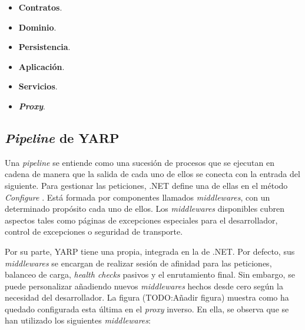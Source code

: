 \documentclass[11pt,spanish,listoffigures]{tfgetsinf}
\begin{document}
\begin{itemize}

	\item \textbf{Contratos}.
	
	\item \textbf{Dominio}.
	
	\item \textbf{Persistencia}.
	
	\item \textbf{Aplicación}.
	
	\item \textbf{Servicios}.
	
	\item \textbf{\emph{Proxy}}.

\end{itemize}


		\subsection{\emph{Pipeline} de YARP}

Una \emph{pipeline} se entiende como una sucesión de procesos que se ejecutan en cadena de manera que la salida de cada uno de ellos se conecta con la entrada del siguiente. Para gestionar las peticiones, .NET define una de ellas en el método \emph{Configure} \cite{MiddlewaresPipeline}. Está formada por componentes llamados \emph{middlewares}, con un determinado propósito cada uno de ellos. Los \emph{middlewares} disponibles cubren aspectos tales como páginas de excepciones especiales para el desarrollador, control de excepciones o seguridad de transporte.

Por su parte, YARP tiene una propia, integrada en la de .NET. Por defecto, sus \emph{middlewares} se encargan de realizar sesión de afinidad para las peticiones, balanceo de carga, \emph{health checks} pasivos y el enrutamiento final. Sin embargo, se puede personalizar añadiendo nuevos \emph{middlewares} hechos desde cero según la necesidad del desarrollador. La figura (TODO:Añadir figura) muestra como ha quedado configurada esta última en el \emph{proxy} inverso. En ella, se observa que se han utilizado los siguientes \emph{middlewares}:

\end{document}
